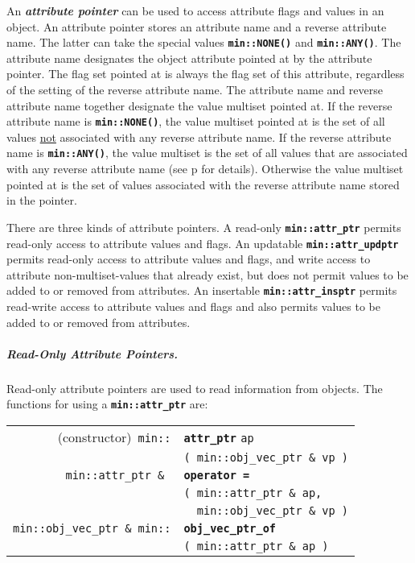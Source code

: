 \documentclass[12pt]{article}
\makeatletter
\newcommand{\subsubsubsubsection}[1]{\subparagraph[#1]{#1.}}
\newcommand{\TT}[1]{{\tt \bfseries #1}}
\newcommand{\key}[1]{{\bf \em #1}\index{#1}}
\newcommand{\ttindex}[1]{\index{#1@{\tt #1}}}
\newcommand{\ttmindex}[2]{\index{#1@{\tt #1}!#2}}
\newcommand{\ttomkey}[3]{\TT{operator #2}\index{#1@{\tt operator #2}!{#3}}}
\newcommand{\pagref}[1]{p\pageref{#1}}
\newcommand{\EOL}{\penalty \exhyphenpenalty}
\newenvironment{indpar}[1][0.3in]%
	{\begin{list}{}%
		     {\setlength{\itemsep}{0in}%
		      \setlength{\topsep}{0in}%
		      \setlength{\parsep}{1ex}%
		      \setlength{\labelwidth}{#1}%
		      \setlength{\leftmargin}{#1}%
		      \addtolength{\leftmargin}{\labelsep}}%
	 \item}%
	{\end{list}}
\newcommand{\LABEL}[1]{\label{#1}}
\newlength{\ARGBREAKLENGTH}
\newcommand{\ARGBREAK}[1][\ARGBREAKLENGTH]{\\&\hspace*{#1}}
\newcommand{\TTOMKEY}[3]{\ttomkey{#1}{#2}{#3}}
\newcommand{\MINKEY}[1]%
	   {\TT{#1}\ttindex{min::#1}\ttindex{#1}}
\newcommand{\MINMKEY}[2]%
           {\TT{#1}\ttmindex{min::#1}{#2}\ttmindex{#1}{#2}}
\makeatother
\begin{document}
An \key{attribute pointer} can be used to access attribute
flags and values
in an object.
An attribute pointer stores an attribute name
and a reverse attribute name.  The latter can take the special
values \TT{min::NONE()} and \TT{min::ANY()}.  The attribute name designates
the object attribute pointed at by the attribute pointer.
The flag set pointed at is always
the flag set of this attribute, regardless of the setting of the
reverse attribute name.  The attribute name and
reverse attribute name together designate the
value multiset pointed at.  If the reverse attribute name
is \TT{min::NONE()}, the value multiset pointed at is the set of all values
\underline{not} associated with any reverse attribute name.  If the
reverse attribute name is \TT{min::ANY()},
the value multiset is the set of all
values that are associated with any reverse attribute name
(see \pagref{REVERSE-ATTRIBUTE-NAME-ANY} for details).
Otherwise the value multiset pointed at is the set of values
associated with the reverse attribute name stored in the pointer.

There are three kinds of attribute pointers.
A read-only \TT{min::\EOL attr\_\EOL ptr}
permits read-only access to attribute values and flags.
An updatable \TT{min::\EOL attr\_\EOL updptr}
permits read-only access to attribute values and flags,
and write access to attribute non-multiset-values that already exist,
but does not permit values to be added to or removed from attributes.
An insertable \TT{min::\EOL attr\_\EOL insptr}
permits read-write access to attribute values and flags
and also permits values to be added to or removed from attributes.

\subsubsubsubsection{Read-Only Attribute Pointers}
\label{READ-ONLY-ATTRIBUTE-POINTERS}

Read-only attribute pointers%
are used to read information from objects.
The functions for using a \TT{min::\EOL attr\_\EOL ptr}
are:\label{READ-ONLY-ATTRIBUTE-FUNCTIONS}

\begin{indpar}\begin{tabular}{r@{}l}
(constructor)~\verb|min::|
	& \MINKEY{attr\_ptr} \verb|ap|\ARGBREAK
	  \verb|( min::obj_vec_ptr & vp )|
\LABEL{MIN::ATTR_PTR_OF_OBJ_VEC_PTR} \\
\verb|min::attr_ptr & |
	& \TTOMKEY{=}{=}{of {\tt min::attr\_ptr}}\ARGBREAK
	  \verb|( min::attr_ptr & ap,|\ARGBREAK
	  \verb|  min::obj_vec_ptr & vp )|
\LABEL{MIN::=ATTR_PTR_OF_OBJ_VEC_PTR} \\
\verb|min::obj_vec_ptr & min::|
	& \MINMKEY{obj\_vec\_ptr\_of}{of {\tt attr\_ptr}}\ARGBREAK
	  \verb|( min::attr_ptr & ap )|
\LABEL{MIN::OBJ_VEC_PTR_OF_ATTR_PTR} \\
\end{tabular}\end{indpar}
\end{document}
